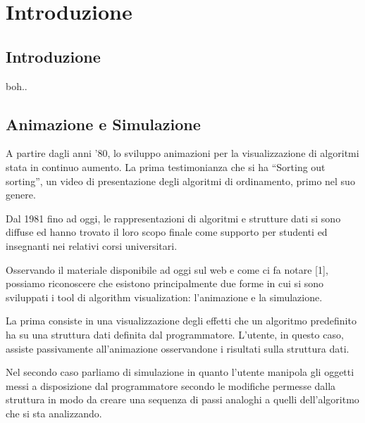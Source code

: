 
\chapter{Introduzione}


\section{Introduzione}

boh..


\section{Animazione e Simulazione}

A partire dagli anni '80, lo sviluppo animazioni per la visualizzazione
di algoritmi stata in continuo aumento. La prima testimonianza che
si ha {}``Sorting out sorting'', un video di presentazione degli
algoritmi di ordinamento, primo nel suo genere.

Dal 1981 fino ad oggi, le rappresentazioni di algoritmi e strutture
dati si sono diffuse ed hanno trovato il loro scopo finale come supporto
per studenti ed insegnanti nei relativi corsi universitari.

Osservando il materiale disponibile ad oggi sul web e come ci fa notare
{[}1{]}, possiamo riconoscere che esistono principalmente due forme
in cui si sono sviluppati i tool di algorithm visualization: l'animazione
e la simulazione.

La prima consiste in una visualizzazione degli effetti che un algoritmo
predefinito ha su una struttura dati definita dal programmatore. L'utente,
in questo caso, assiste passivamente all'animazione osservandone i
risultati sulla struttura dati.

Nel secondo caso parliamo di simulazione in quanto l'utente manipola
gli oggetti messi a disposizione dal programmatore secondo le modifiche
permesse dalla struttura in modo da creare una sequenza di passi analoghi
a quelli dell'algoritmo che si sta analizzando.

